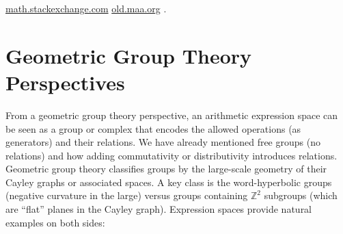 \documentclass[11pt]{article}
\theoremstyle{remark}
\begin{document}
\href{https://math.stackexchange.com/questions/38936/analogies-between-prime-ideals-and-knots#:~:text=,between%20prime%20ideals%20and%20knots}{math.stackexchange.com}
\href{https://old.maa.org/press/maa-reviews/knots-and-primes-an-introduction-to-arithmetic-topology#:~:text=All%20right%2C%20then%2C%20what%20does,manifolds%20and%20%E2%80%9Cnumber%20rings.%E2%80%9D}{old.maa.org}
.

\section*{Geometric Group Theory Perspectives}
From a geometric group theory perspective, an arithmetic expression space can be seen as a group or complex that encodes the allowed operations (as generators) and their relations. We have already mentioned free groups (no relations) and how adding commutativity or distributivity introduces relations. Geometric group theory classifies groups by the large-scale geometry of their Cayley graphs or associated spaces. A key class is the word-hyperbolic groups (negative curvature in the large) versus groups containing $\mathbb{Z}^2$ subgroups (which are “flat” planes in the Cayley graph). Expression spaces provide natural examples on both sides:
\end{document}
